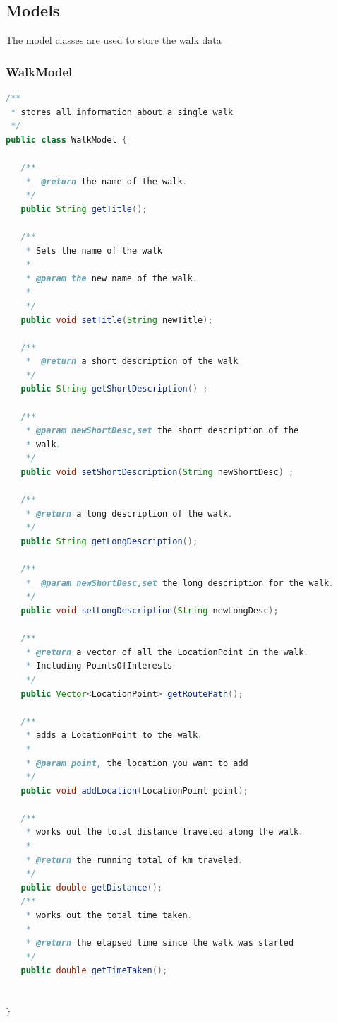 \documentclass[12pt]{article}
\begin{document}
\subsection{Models}
The model classes are used to store the walk data
\subsubsection{WalkModel}
\begin{lstlisting}[language=java]
/**
 * stores all information about a single walk
 */
public class WalkModel {    

   /**
    *  @return the name of the walk.
    */
   public String getTitle();

   /**
    * Sets the name of the walk
    * 
    * @param the new name of the walk.
    * 
    */
   public void setTitle(String newTitle);

   /**
    *  @return a short description of the walk 
    */
   public String getShortDescription() ;

   /**
    * @param newShortDesc,set the short description of the
    * walk. 
    */
   public void setShortDescription(String newShortDesc) ;

   /** 
    * @return a long description of the walk.
    */
   public String getLongDescription();

   /**
    *  @param newShortDesc,set the long description for the walk.
    */
   public void setLongDescription(String newLongDesc);

   /**
    * @return a vector of all the LocationPoint in the walk. 
    * Including PointsOfInterests
    */
   public Vector<LocationPoint> getRoutePath();

   /** 
    * adds a LocationPoint to the walk. 
    * 
    * @param point, the location you want to add
    */
   public void addLocation(LocationPoint point);

   /**
    * works out the total distance traveled along the walk.
    * 
    * @return the running total of km traveled. 
    */
   public double getDistance();
   /** 
    * works out the total time taken.
    * 
    * @return the elapsed time since the walk was started
    */
   public double getTimeTaken();


}
\end{lstlisting}
\end{document}
